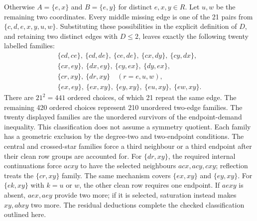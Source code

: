 \documentclass[11pt,a4paper]{article}
\theoremstyle{definition}
\theoremstyle{remark}
\begin{document}
Otherwise $A=\{e,x\}$ and $B=\{e,y\}$ for distinct $e,x,y\in R$.
Let $u,w$ be the remaining two coordinates. Every middle missing edge
is one of the 21 pairs from $\{c,d,e,x,y,u,w\}$. Substituting these
possibilities in the explicit definition of $D$, and retaining two
distinct edges with $D\le2$, leaves exactly the following twenty
labelled families:
\[
\begin{gathered}
 \{cd,ce\},\ \{cd,de\},\ \{ce,de\},\ \{cx,dy\},\ \{cy,dx\},\\
 \{cx,ey\},\ \{dx,ey\},\ \{cy,ex\},\ \{dy,ex\},\\
 \{cr,xy\},\ \{dr,xy\}\quad(r=e,u,w),\\
 \{ex,ey\},\ \{ex,xy\},\ \{ey,xy\},\ \{eu,xy\},\ \{ew,xy\}.
\end{gathered}
\]
There are $21^2=441$ ordered choices, of which 21 repeat the same edge. The remaining 420 ordered choices represent 210 unordered two-edge families. The twenty displayed families are the unordered survivors of the endpoint-demand inequality. This classification does not assume a symmetry quotient. Each
family has a geometric exclusion by the degree-two and two-endpoint
conditions. The central and crossed-star families force a third neighbour
or a third endpoint after their clean row groups are accounted for.
For $\{dr,xy\}$, the required internal continuations force $acxy$ to
have the selected neighbours $acx,acy,cxy$; reflection treats the
$\{cr,xy\}$ family. The same mechanism covers $\{ex,xy\}$ and
$\{ey,xy\}$. For $\{ek,xy\}$ with $k=u$ or $w$, the other clean row
requires one endpoint. If $aexy$ is absent, $aex,aey$ provide two more;
if it is selected, saturation instead makes $xy,abxy$ two more.
The residual deductions complete the checked classification outlined here.
\end{document}
